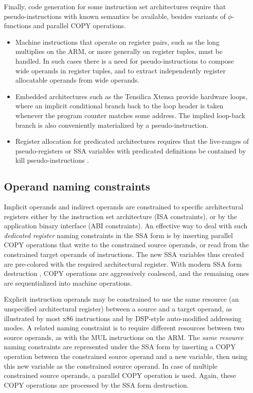 Finally, code generation for some instruction set architectures require that
pseudo-instructions with known semantics be available, besides variants of
$\phi$-functions and parallel COPY operations. \begin{itemize}

\item Machine instructions that operate on register pairs, such as the long
multiplies on the ARM, or more generally on register tuples, must be handled. In such
cases there is a need for pseudo-instructions to compose wide operands in
register tuples, and to extract independently register allocatable operands from
wide operands.

\item Embedded architectures such as the Tensilica Xtensa provide hardware
loops, where an implicit conditional branch back to the loop header is taken
whenever the program counter matches some address. The implied loop-back branch
is also conveniently materialized by a pseudo-instruction.

\item Register allocation for predicated architectures requires that the live-ranges
of pseudo-registers or SSA variables with predicated definitions be contained by
kill pseudo-instructions \cite{Gillies:1996:MICRO}.

\end{itemize}

\subsection{Operand naming constraints}

Implicit operands and indirect operands are constrained to specific
architectural registers either by the instruction set architecture (ISA
constraints), or by the application binary interface (ABI constraints). An
effective way to deal with such \emph{dedicated register} naming constraints in
the SSA form is by inserting parallel COPY operations that write to the
constrained source operands, or read from the constrained target operands of
instructions.  The new SSA variables thus created are pre-colored with the
required architectural register. With modern SSA form destruction
\cite{Sreedhar:1999:SAS,Boissinot:2009:CGO}, COPY operations are aggressively
coalesced, and the remaining ones are sequentialized into machine operations.

Explicit instruction operands may be constrained to use the same resource (an
unspecified architectural register) between a source and a target operand, as
illustrated by most x86 instructions and by DSP-style auto-modified addressing
modes.  A related naming constraint is to require different resources between
two source operands, as with the MUL instructions on the ARM. The \emph{same
resource} naming constraints are represented under the SSA form by inserting a
COPY operation between the constrained source operand and a new variable, then
using this new variable as the constrained source operand. In case of multiple
constrained source operands, a parallel COPY operation is used.  Again, these
COPY operations are processed by the SSA form destruction.

